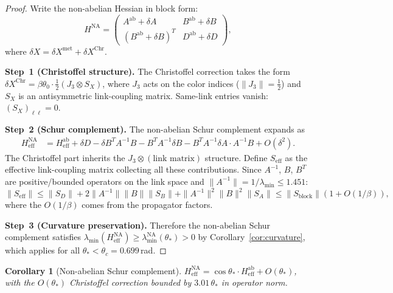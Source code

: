 \documentclass[11pt]{article}
\newtheorem{corollary}[theorem]{Corollary}
\theoremstyle{definition}
\begin{document}
\begin{proof}
Write the non-abelian Hessian in block form:
\[
H^{\mathrm{NA}}=\begin{pmatrix}
A^{\mathrm{ab}}+\delta A & B^{\mathrm{ab}}+\delta B\\
(B^{\mathrm{ab}}+\delta B)^T & D^{\mathrm{ab}}+\delta D
\end{pmatrix},
\]
where $\delta X=\delta X^{\mathrm{met}}+\delta X^{\mathrm{Chr}}$.

\medskip\noindent\textbf{Step~1 (Christoffel structure).}
The Christoffel correction takes the form
$\delta X^{\mathrm{Chr}}=\beta\theta_0\cdot\frac{1}{2}
(J_3\otimes S_X)$,
where $J_3$ acts on the color indices ($\|J_3\|=\frac{1}{2}$) and
$S_X$ is an antisymmetric link-coupling matrix.  Same-link
entries vanish: $(S_X)_{\ell\ell}=0$.

\medskip\noindent\textbf{Step~2 (Schur complement).}
The non-abelian Schur complement expands as
\begin{align}
H_{\mathrm{eff}}^{\mathrm{NA}}
&=H_{\mathrm{eff}}^{\mathrm{ab}}
+\delta D-\delta B^T A^{-1}B-B^T A^{-1}\delta B
-B^T A^{-1}\delta A\cdot A^{-1}B+O(\delta^2).
\end{align}
The Christoffel part inherits the $J_3\otimes(\text{link matrix})$
structure.  Define $S_{\mathrm{eff}}$ as the effective link-coupling
matrix collecting all these contributions.  Since $A^{-1}$, $B$, $B^T$
are positive/bounded operators on the link space and
$\|A^{-1}\|=1/\lambda_{\min}\le 1.451$:
\[
\|S_{\mathrm{eff}}\|\le\|S_D\|+2\|A^{-1}\|\|B\|\|S_B\|
+\|A^{-1}\|^2\|B\|^2\|S_A\|\le\|S_{\mathrm{block}}\|(1+O(1/\beta)),
\]
where the $O(1/\beta)$ comes from the propagator factors.

\medskip\noindent\textbf{Step~3 (Curvature preservation).}
Therefore the non-abelian Schur complement satisfies
$\lambda_{\min}(H_{\mathrm{eff}}^{\mathrm{NA}})
\ge\lambda_{\min}^{\mathrm{NA}}(\theta_*)>0$
by Corollary~\ref{cor:curvature},
which applies for all $\theta_*<\theta_c=0.699$\,rad.
\end{proof}

\begin{corollary}[Non-abelian Schur complement]\label{cor:NAschur}
$H_{\mathrm{eff}}^{\mathrm{NA}}=\cos\theta_*\cdot
H_{\mathrm{eff}}^{\mathrm{ab}}+O(\theta_*)$, with the
$O(\theta_*)$ Christoffel correction bounded by
$3.01\,\theta_*$ in operator norm.
\end{corollary}

\end{document}
